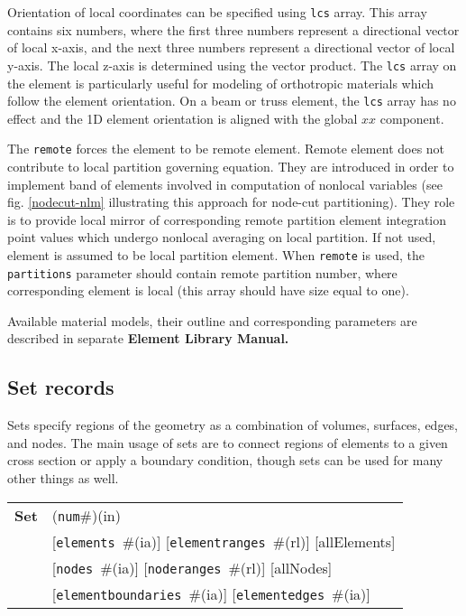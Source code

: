\documentclass[a4paper]{article}
\newcommand{\param}[1]{\texttt{#1}} %
\newcommand{\optional}[1]{[#1]} %
\newcommand{\field}[2]{\param{#1}~\#{\tiny(#2)}} %
\newcommand{\optField}[2]{\optional{\field{#1}{#2}}}
\newcommand{\componentNum}{(\param{num}\#){\tiny(in)}} %
\newcommand{\entKeywordInst}[1]{\textbf{#1}} %
\newcommand{\Pmode}[1]{{\sffamily #1}}
\newenvironment{record}[1][]{\begin{tabular}{|ll}}{\end{tabular}\\}
\newcommand{\recentry}[2]{{#1}&{#2}\\}
\newcounter{rcc}
\newenvironment{record}[1][\textwidth]{\setcounter{rcc}{0}\rowcolors{1}{lightgray}{lightgray}\tabularx{#1}{llR} \hline}
               {\endtabularx}
\newcommand{\recentry}[2]{\ifthenelse{\value{rcc}>0}{$\backslash$ \\}{\setcounter{rcc}{1}}{#1}&{#2}&}
\begin{document}
Orientation of local coordinates can be specified using \param{lcs} array. This array contains six numbers,
where the first three numbers represent a directional vector of local
x-axis, and the next three numbers represent a directional vector of local
y-axis. The local z-axis is determined using the vector product. The \param{lcs} array on the element is particularly useful for modeling of orthotropic materials which follow the element orientation. On a beam or truss element, the \param{lcs} array has no effect and the 1D element orientation is aligned with the global $xx$ component.

\Pmode{
The \param{remote} forces the element to be remote element. Remote
element does not contribute to local partition governing equation.
They are introduced in order to implement band of elements involved
in computation of nonlocal variables (see fig. \ref{nodecut-nlm} illustrating
this approach for node-cut partitioning). They role is to provide
local mirror of corresponding remote partition element integration point values which undergo
nonlocal averaging on local partition.
If not used, element is assumed to be local partition element.
When \param{remote} is used, the \param{partitions} parameter should
contain remote partition number, where
corresponding element is local (this array should have size equal to one).
}


Available material models, their outline and
corresponding parameters are described in separate \textbf{Element Library Manual.}


\subsection{Set records}
\label{_SetRecords}

Sets specify regions of the geometry as a combination of volumes, surfaces, edges, and nodes.
The main usage of sets are to connect regions of elements to a given cross section or apply a boundary condition, though sets can be used for many other things as well.

\begin{record}[0.9\textwidth]
  \recentry{\entKeywordInst{Set}}{\componentNum}
  \recentry{}{\optField{elements}{ia} \optField{elementranges}{rl} \optional{allElements}}
  \recentry{}{\optField{nodes}{ia} \optField{noderanges}{rl} \optional{allNodes}}
  \recentry{}{\optField{elementboundaries}{ia} \optField{elementedges}{ia}}
\end{record}
\end{document}

